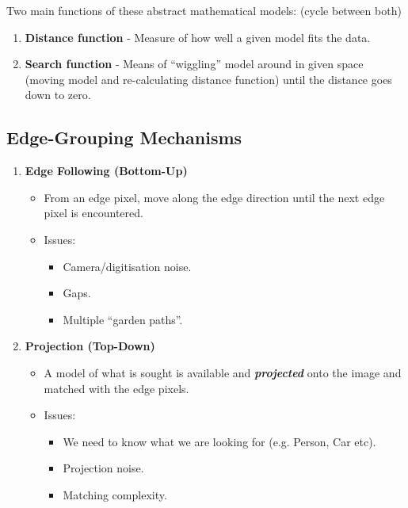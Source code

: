 \documentclass[english, 10pt]{article}
\begin{document}
  Two main functions of these abstract mathematical models: (cycle between both)

  \begin{enumerate}
  \def\labelenumi{\arabic{enumi}.}
  \item
    \textbf{Distance function} - Measure of how well a given model fits
    the data.
  \item
    \textbf{Search function} - Means of ``wiggling'' model around in
    given space (moving model and re-calculating distance function)
    until the distance goes down to zero.
  \end{enumerate}

\subsection{Edge-Grouping Mechanisms}

\begin{enumerate}

\item \textbf{Edge Following (Bottom-Up)}

\begin{itemize}
 \item
    From an edge pixel, move along the edge direction until the next
    edge pixel is encountered.
\item
  Issues:

  \begin{itemize}
  \itemsep1pt\parskip0pt
  \item
    Camera/digitisation noise.
  \item
    Gaps.
  \item
    Multiple ``garden paths''.
  \end{itemize}
\end{itemize}

\item \textbf{Projection (Top-Down)}

\begin{itemize}
\item
  A model of what is sought is available and \textbf{\emph{projected}}
  onto the image and matched with the edge pixels.
\item
  Issues:

  \begin{itemize}
  \item
    We need to know what we are looking for (e.g. Person, Car etc).
  \item
    Projection noise.
  \item
    Matching complexity.
  \end{itemize}
  \end{itemize}
\end{enumerate}
\end{document}
